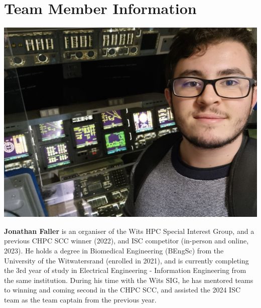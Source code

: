\documentclass[10pt, onecolumn]{IEEEtran}
\begin{document}
\section{Team Member Information}
\vspace{0.02\textwidth} 
\noindent
\begin{minipage}{0.2\textwidth}
  \includegraphics[width=\textwidth]{Jono_bio_pic.jpg}
\end{minipage}
\hspace{0.02\textwidth} %
\begin{minipage}{0.65\textwidth}
\textbf{Jonathan Faller} is an organiser of the Wits HPC Special Interest Group, and a previous CHPC SCC winner (2022), and ISC competitor (in-person and online, 2023). He holds a degree in Biomedical Engineering (BEngSc) from the University of the Witwatersrand (enrolled in 2021), and is currently completing the 3rd year of study in Electrical Engineering - Information Engineering from the same institution. During his time with the Wits SIG, he has mentored teams to winning and coming second in the CHPC SCC, and assisted the 2024 ISC team as the team captain from the previous year.
\end{minipage}
\\\\\\
\noindent
\end{document}
